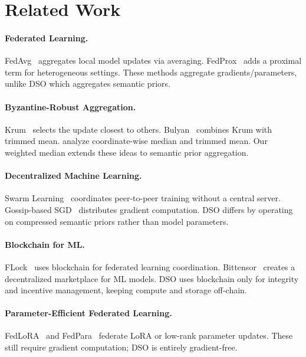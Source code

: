\documentclass[11pt]{article}
\begin{document}
\section{Related Work}
\label{sec:related}

\paragraph{Federated Learning.}
FedAvg~\cite{mcmahan2017communication} aggregates local model updates via
averaging. FedProx~\cite{li2020federated} adds a proximal term for
heterogeneous settings. These methods aggregate gradients/parameters, unlike
DSO which aggregates semantic priors.

\paragraph{Byzantine-Robust Aggregation.}
Krum~\cite{blanchard2017machine} selects the update closest to others.
Bulyan~\cite{mhamdi2018hidden} combines Krum with trimmed mean.
\cite{yin2018byzantine} analyze coordinate-wise median and trimmed mean.
Our weighted median extends these ideas to semantic prior aggregation.

\paragraph{Decentralized Machine Learning.}
Swarm Learning~\cite{warnat2021swarm} coordinates peer-to-peer training
without a central server. Gossip-based SGD~\cite{koloskova2020unified}
distributes gradient computation. DSO differs by operating on compressed
semantic priors rather than model parameters.

\paragraph{Blockchain for ML.}
FLock~\cite{flock2024} uses blockchain for federated learning coordination.
Bittensor~\cite{bittensor2023} creates a decentralized marketplace for ML
models. DSO uses blockchain only for integrity and incentive management,
keeping compute and storage off-chain.

\paragraph{Parameter-Efficient Federated Learning.}
FedLoRA~\cite{zhang2024fedlora} and FedPara~\cite{hyeon2022fedpara}
federate LoRA or low-rank parameter updates. These still require gradient
computation; DSO is entirely gradient-free.
\end{document}
